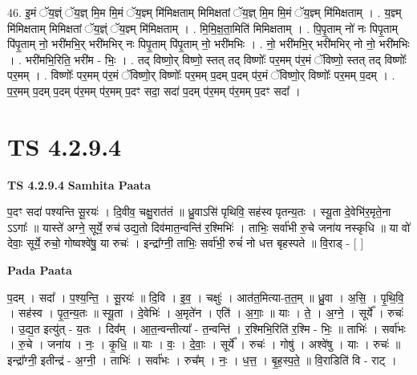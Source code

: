 \documentclass[17pt]{extarticle}
\begin{document}
46. इ॒मं ॅय॒ज्ञ्ं ॅय॒ज्ञ् मि॒म मि॒मं ॅय॒ज्ञ्म् मि॑मिक्षताम् मिमिक्षतां ॅय॒ज्ञ् मि॒म मि॒मं ॅय॒ज्ञ्म् मि॑मिक्षताम् । . य॒ज्ञ्म् मि॑मिक्षताम् मिमिक्षतां ॅय॒ज्ञ्ं ॅय॒ज्ञ्म् मि॑मिक्षताम् । . मि॒मि॒क्ष॒ता॒मिति॑ मिमिक्षताम् । . पि॒पृ॒ताम् नो॑ नः पिपृ॒ताम् पि॑पृ॒ताम् नो॒ भरी॑मभि॒र् भरी॑मभिर् नः पिपृ॒ताम् पि॑पृ॒ताम् नो॒ भरी॑मभिः । . नो॒ भरी॑मभि॒र् भरी॑मभिर् नो नो॒ भरी॑मभिः । . भरी॑मभि॒रिति॒ भरी॑म - भिः॒ । . तद् विष्णो॒र् विष्णो॒ स्तत् तद् विष्णोः᳚ पर॒मम् प॑र॒मं ॅविष्णो॒ स्तत् तद् विष्णोः᳚ पर॒मम् । . विष्णोः᳚ पर॒मम् प॑र॒मं ॅविष्णो॒र् विष्णोः᳚ पर॒मम् प॒दम् प॒दम् प॑र॒मं ॅविष्णो॒र् विष्णोः᳚ पर॒मम् प॒दम् । . प॒र॒मम् प॒दम् प॒दम् प॑र॒मम् प॑र॒मम् प॒दꣳ सदा॒ सदा॑ प॒दम् प॑र॒मम् प॑र॒मम् प॒दꣳ सदा᳚ । \newline
\pagebreak
{}

\section{ TS 4.2.9.4 }

\textbf{TS 4.2.9.4 } \newline
\textbf{Samhita Paata} \newline

प॒दꣳ सदा॑ पश्यन्ति सू॒रयः॑ । दि॒वीव॒ चक्षु॒रात॑तं ॥ ध्रु॒वाऽसि॑ पृथिवि॒ सह॑स्व पृतन्य॒तः । स्यू॒ता दे॒वेभि॑र॒मृते॒ना ऽऽगाः᳚ ॥ यास्ते॑ अग्ने॒ सूर्ये॒ रुच॑ उद्य॒तो दिव॑मात॒न्वन्ति॑ र॒श्मिभिः॑ । ताभिः॒ सर्वा॑भी रु॒चे जना॑य नस्कृधि ॥ या वो॑ देवाः॒ सूर्ये॒ रुचो॒ गोष्वश्वे॑षु॒ या रुचः॑ । इन्द्रा᳚ग्नी॒ ताभिः॒ सर्वा॑भी॒ रुचं॑ नो धत्त बृहस्पते ॥ वि॒राड् - [  ] \newline

\textbf{Pada Paata} \newline

प॒दम् । सदा᳚ । प॒श्य॒न्ति॒ । सू॒रयः॑ ॥ दि॒वि । इ॒व॒ । चक्षुः॑ । आत॑त॒मित्या-त॒त॒म् ॥ ध्रु॒वा । अ॒सि॒ । पृ॒थि॒वि॒ । सह॑स्व । पृ॒त॒न्य॒तः ॥ स्यू॒ता । दे॒वेभिः॑ । अ॒मृते॑न । एति॑ । अ॒गाः॒ ॥ याः । ते॒ । अ॒ग्ने॒ । सूर्ये᳚ । रुचः॑ । उ॒द्य॒त इत्यु॑त् - य॒तः । दिव᳚म् । आ॒त॒न्वन्तीत्या᳚ - त॒न्वन्ति॑ । र॒श्मिभि॒रिति॑ र॒श्मि - भिः॒ ॥ ताभिः॑ । सर्वा॑भः । रु॒चे । जना॑य । नः॒ । कृ॒धि॒ ॥ याः । वः॒ । दे॒वाः॒ । सूर्ये᳚ । रुचः॑ । गोषु॑ । अश्वे॑षु । याः । रुचः॑ ॥ इन्द्रा᳚ग्नी॒ इतीन्द्र॑ - अ॒ग्नी॒ । ताभिः॑ । सर्वा॑भः । रुच᳚म् । नः॒ । ध॒त्त॒ । बृ॒ह॒स्प॒ते॒ ॥ वि॒राडिति॑ वि - राट् ।  \newline
\end{document}

